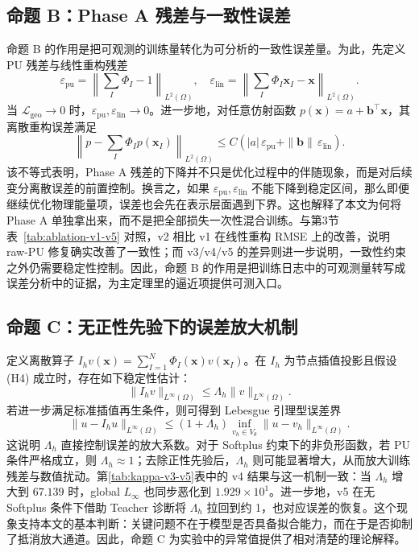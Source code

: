 ﻿\documentclass[lang=cn,a4paper]{elegantpaper}
\newcommand{\epspu}{\varepsilon_{\mathrm{pu}}}
\newcommand{\epslin}{\varepsilon_{\mathrm{lin}}}
\begin{document}
\subsection{命题 B：Phase A 残差与一致性误差}
命题 B 的作用是把可观测的训练量转化为可分析的一致性误差量。为此，先定义 PU 残差与线性重构残差
\begin{equation}
  \epspu=\left\|\sum_I\Phi_I-1\right\|_{L^2(\Omega)},\quad
  \epslin=\left\|\sum_I\Phi_I\bm{x}_I-\bm{x}\right\|_{L^2(\Omega)}.
\end{equation}
当 $\mathcal{L}_{\mathrm{geo}}\to 0$ 时，$\epspu,\epslin\to 0$。进一步地，对任意仿射函数 $p(\bm{x})=a+\bm{b}^\top\bm{x}$，其离散重构误差满足
\begin{equation}
  \left\|p-\sum_I\Phi_I p(\bm{x}_I)\right\|_{L^2(\Omega)}
  \le C\left(|a|\,\epspu+\|\bm{b}\|\,\epslin\right).
\end{equation}
该不等式表明，Phase A 残差的下降并不只是优化过程中的伴随现象，而是对后续变分离散误差的前置控制。换言之，如果 $\epspu,\epslin$ 不能下降到稳定区间，那么即便继续优化物理能量项，误差也会先在表示层面遇到下界。这也解释了本文为何将 Phase A 单独拿出来，而不是把全部损失一次性混合训练。与第3节表~\ref{tab:ablation-v1-v5} 对照，v2 相比 v1 在线性重构 RMSE 上的改善，说明 raw-PU 修复确实改善了一致性；而 v3/v4/v5 的差异则进一步说明，一致性约束之外仍需要稳定性控制。因此，命题 B 的作用是把训练日志中的可观测量转写成误差分析中的证据，为主定理里的逼近项提供可测入口。

\subsection{命题 C：无正性先验下的误差放大机制}
\label{subsec:lebesgue}
定义离散算子 $I_h v(\bm{x})=\sum_{I=1}^N\Phi_I(\bm{x})v(\bm{x}_I)$。在 $I_h$ 为节点插值投影且假设 (H4) 成立时，存在如下稳定性估计：
\begin{equation}
  \|I_h v\|_{L^\infty(\Omega)} \le \Lambda_h \|v\|_{L^\infty(\Omega)}.
\end{equation}
若进一步满足标准插值再生条件，则可得到 Lebesgue 引理型误差界
\begin{equation}
  \|u-I_hu\|_{L^\infty(\Omega)}
  \le (1+\Lambda_h)\inf_{v_h\in V_\theta}\|u-v_h\|_{L^\infty(\Omega)}.
\end{equation}
这说明 $\Lambda_h$ 直接控制误差的放大系数。对于 Softplus 约束下的非负形函数，若 PU 条件严格成立，则 $\Lambda_h\approx1$；去除正性先验后，$\Lambda_h$ 则可能显著增大，从而放大训练残差与数值扰动。第\ref{tab:kappa-v3-v5}表中的 v4 结果与这一机制一致：当 $\Lambda_h$ 增大到 $67.139$ 时，global $L_\infty$ 也同步恶化到 $1.929\times10^1$。进一步地，v5 在无 Softplus 条件下借助 Teacher 诊断将 $\Lambda_h$ 拉回到约 1，也对应误差的恢复。这个现象支持本文的基本判断：关键问题不在于模型是否具备拟合能力，而在于是否抑制了抵消放大通道。因此，命题 C 为实验中的异常值提供了相对清楚的理论解释。
\end{document}
